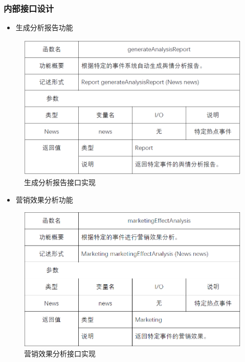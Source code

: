 \subsubsection{内部接口设计}
\begin{itemize}
	\item 生成分析报告功能
\end{itemize}
\begin{figure}[!htbp]
	\centering
	\includegraphics[scale=0.7]{image/b28.png} %
	\caption{生成分析报告接口实现} %
\end{figure}
\begin{itemize}
	\item 营销效果分析功能
\end{itemize}
\begin{figure}[!htbp]
	\centering
	\includegraphics[scale=0.7]{image/b23.png} %
	\caption{营销效果分析接口实现} %
\end{figure}
